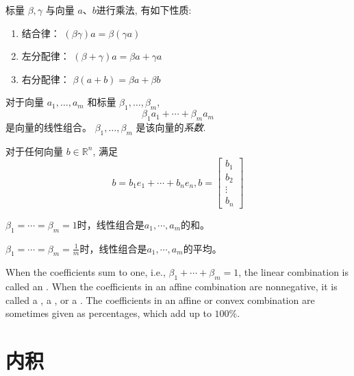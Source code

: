 \begin{theorem}
    标量 \( \beta, \gamma \) 与向量 \( a 、 b \)进行乘法, 有如下性质:
    \begin{enumerate}
        \item 结合律： \( (\beta \gamma) a=\beta(\gamma a) \)
        \item 左分配律： \( (\beta+\gamma) a=\beta a+\gamma a \)
        \item 右分配律： \( \beta(a+b)=\beta a+\beta b \)
    \end{enumerate}
\end{theorem}

\begin{definition}[线性组合]
    对于向量 \( a_{1}, \ldots, a_{m} \) 和标量 \( \beta_{1}, \ldots, \beta_{m} \),
    $$ \beta_{1} a_{1}+\cdots+\beta_{m} a_{m} $$
    是向量的线性组合。 \( \beta_{1}, \ldots, \beta_{m} \) 是该向量的\textit{系数}. 
\end{definition}



    \begin{theorem}
        对于任何向量 \( b \in \mathbb{R}^{n} \), 满足
    $$ b=b_{1} e_{1}+\cdots+b_{n} e_{n}, b=\left[\begin{array}{c}b_{1} \\ b_{2} \\ \vdots \\ b_{n}\end{array}\right] $$
    \end{theorem}
    
    $ \beta_{1}=\cdots=\beta_{m}=1 $时，线性组合是$a_1, \cdots, a_m$的和。

    $ \beta_{1}=\cdots=\beta_{m} = \frac{1}{m} $时，线性组合是$a_1, \cdots, a_m$的平均。

    When the coefficients sum to one, i.e., $ \beta_{1}+\cdots+\beta_{m}=1 $, the linear combination is called an . When the coefficients in an affine combination are nonnegative, it is called a , a , or a . The coefficients in an affine or convex combination are sometimes given as percentages, which add up to $ 100 \% $.

\section{内积}

